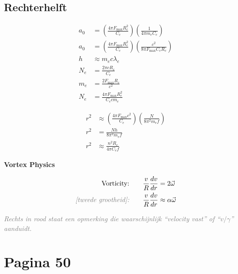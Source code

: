 \documentclass[11pt,a4paper]{article}
\newcommand{\uncertain}[1]{\textit{\textcolor{gray}{#1}}}
\begin{document}
\begin{minipage}[t]{0.48\textwidth}
\subsection*{Rechterhelft}
\begin{align*}
a_0 &=
\left(\frac{4\pi F_{\max} R_c^2}{C_e}\right)
\left(\frac{1}{4\pi m_e C_e}\right)
\\[0.3em]
a_0 &=
\left(\frac{4\pi F_{\max} R_c^2}{C_e}\right)
\left(\frac{c^2}{8\pi F_{\max} C_e R_c}\right)
\\[0.3em]
h &\approx m_e c \lambda_e
\\
N_e &= \frac{2\pi c R_c}{C_e}
\\
m_e &= \frac{2 F_{\max} R_c}{c^2}
\\
N_e &= \frac{4\pi F_{\max} R_c^2}{C_e c m_e}
\end{align*}

{\color{green!50!black}
\begin{align*}
r^2 &\approx
\left(\frac{4\pi F_{\max} c^2}{C_e}\right)
\left(\frac{N}{8\pi^2 m_e f}\right)
\\
r^2 &= \frac{N h}{8\pi^2 m_e f}
\\
r^2 &\approx \frac{n^2 R_c}{4\pi C_e f}
\end{align*}
}

\medskip
\textbf{\color{red!70!black}Vortex Physics}

{\color{red!70!black}
\begin{align*}
\text{Vorticity:}\qquad
\frac{v}{R}\frac{dv}{dr} &= 2\vec{\omega}
\\
\text{\uncertain{[tweede grootheid]:}}\qquad
\frac{v}{R}\frac{dv}{dr} &\approx \alpha \vec{\omega}
\end{align*}
}

\uncertain{Rechts in rood staat een opmerking die waarschijnlijk ``velocity vast'' of ``$v/\gamma$'' aanduidt.}
\end{minipage}

\clearpage
\section*{Pagina 50}
\end{document}
